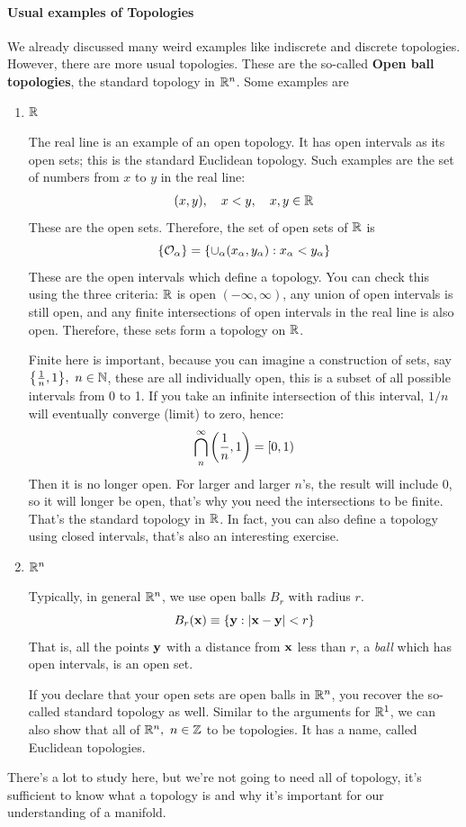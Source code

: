 		\paragraph{Usual examples of Topologies}
			We already discussed many weird examples like indiscrete and discrete topologies. However, there
			are more usual topologies. These are the so-called \textbf{Open ball topologies}, the standard
			topology in $\mathbb{R}^n$. Some examples are
			\begin{enumerate}[(1)]
			    \item $\mathbb{R}$

					  The real line is an example of an open topology. It has open intervals as its open sets; this is the standard 
					  Euclidean topology. Such examples are the set of numbers from $x$ to $y$ in the real line:
					  \begin{align*}
						  (x,y),\quad x<y,\quad x,y \in \mathbb{R}
					  \end{align*}
					  These are the open sets. Therefore, the set of open sets of $\mathbb{R}$ is
					  \[
						  \qty{\mathcal{O}_\alpha} = \qty{\cup_\alpha(x_\alpha,y_\alpha): x_\alpha<y_\alpha}
					  \]
					  These are the open intervals which define a topology. You can check this using the three criteria: $\mathbb{R}$ is open $(-\infty,\infty)$, any union
					  of open intervals is still open, and any finite intersections of open intervals in the real line is also open. Therefore, these sets form a topology on $\mathbb{R}$.
					  \begin{remark}
						  Finite here is important, because you can imagine a construction of sets, say $\qty{\frac{1}{n},1},\ n\in\N$, these are all individually open, this is a subset 
						  of all possible intervals from 0 to 1. If you take an infinite intersection of this interval, $1/n$ will eventually converge (limit) to zero, hence:
						  \[
							  \bigcap_n^\infty \pqty{\frac{1}{n},1} = [0,1)
						  \]
						  Then it is no longer open. For larger and larger $n$'s, the result will include $0$, so it will longer be 
						  open, that's why you need the intersections to be finite. That's the standard topology in $\mathbb{R}$. In fact, 
						  you can also define a topology using closed intervals, that's also an interesting exercise.
					  \end{remark}

				\item $\mathbb{R}^n$ 

					  Typically, in general $\mathbb{R}^n$, we use open balls $B_r$ with radius $r$. 
					  \[
						  B_r(\vb x) \equiv \qty{\vb y : \abs{\vb{x}-\vb{y}} < r}
					  \]
					  That is, all the points $\vb y$ with a distance from $\vb x$ less than $r$, a \textit{ball} which has open intervals, is an open 
					  set.

					  If you declare that your open sets are open balls in $\mathbb{R}^n$, you recover the so-called standard topology as well. 
					  Similar to the arguments for $\mathbb{R}^1$, we can also show that all of $\mathbb{R}^n,\ n\in\mathbb{Z}$ to be topologies. It has a name, called
					  Euclidean topologies.
			\end{enumerate}
			There's a lot to study here, but we're not going to need all of topology, it's sufficient to know what a topology is and why it's important
			for our understanding of a manifold. 

